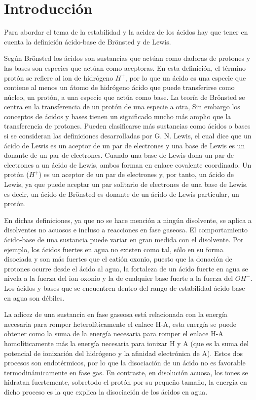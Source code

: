 \chapter{Introducción}
Para abordar el tema de la estabilidad y la acidez de los ácidos hay que tener en cuenta la definición ácido-base de Brönsted y de Lewis.

Según Brönsted los ácidos son sustancias que actúan como dadoras de protones y las bases son especies que actúan como aceptoras. En esta definición, el término protón se refiere al ion de hidrógeno $H^+$, por lo que un ácido es una especie que contiene al menos un átomo de hidrógeno ácido que puede transferirse como núcleo, un protón, a una especie que actúa como base. La teoría de Brönsted se centra en la transferencia de un protón de una especie a otra, Sin embargo los conceptos de ácidos y bases tienen un significado mucho más amplio que la transferencia de protones. Pueden clasificarse más sustancias como ácidos o bases si se consideran las definiciones desarrolladas por G. N. Lewis, el cual dice que un ácido de Lewis es un aceptor de un par de electrones y una base de Lewis es un donante de un par de electrones. Cuando una base de Lewis dona un par de electrones a un ácido de Lewis, ambos forman en enlace covalente coordinado. Un protón ($H^+$) es un aceptor de un par de electrones y, por tanto, un ácido de Lewis, ya que puede aceptar un par solitario de electrones de una base de Lewis. es decir, un ácido de Brönsted es donante de un ácido de Lewis particular, un protón. 

En dichas definiciones, ya que no se hace mención a ningún disolvente, se aplica a disolventes no acuosos e incluso a reacciones en fase gaseosa. El comportamiento ácido-base de una sustancia puede variar en gran medida con el disolvente. Por ejemplo, los ácidos fuertes en agua no existen como tal, sólo en su forma disociada y son más fuertes que el catión oxonio, puesto que la donación de protones ocurre desde el ácido al agua, la fortaleza de un ácido fuerte en agua se nivela a la fuerza del ion oxonio y la de cualquier base fuerte a la fuerza del $OH ^-$. Los ácidos y bases que se encuentren dentro del rango de estabilidad ácido-base en agua son débiles. \cite {quimica1}

La adicez de una sustancia en fase gaseosa está relacionada con la energía necesaria para romper heterolíticamente el enlace H-A, esta energía se puede obtener como la suma de la energía necesaria para romper el enlace H-A homolíticamente más la energía necesaria para ionizar H y A (que es la suma del potencial de ionización del hidrógeno y la afinidad electrónica de A). Estos dos procesos son endotérmicos, por lo que la disociación de un ácido no es favorable termodinámicamente en fase gas. En contraste, en disolución acuosa, los iones se hidratan fuertemente, sobretodo el protón por su pequeño tamaño, la energía en dicho proceso es la que explica la disociación de los ácidos en agua.

